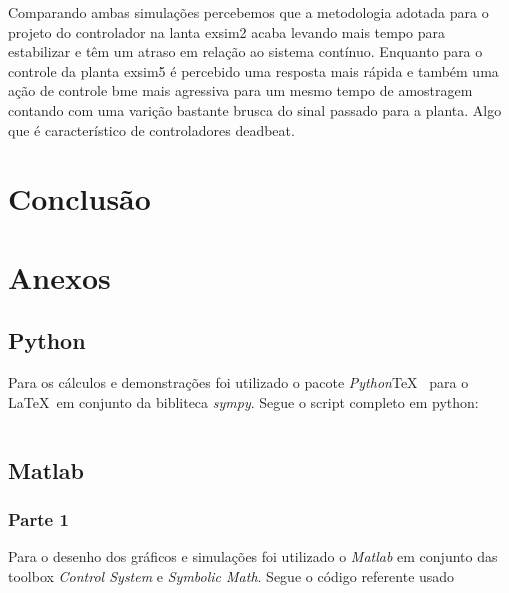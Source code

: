 \documentclass[a4paper,11pt]{article}
\begin{document}
Comparando ambas simulações percebemos que a metodologia adotada para o projeto do controlador na lanta exsim2 acaba levando mais tempo para estabilizar e têm um atraso em relação ao sistema contínuo. Enquanto para o controle da planta exsim5 é percebido uma resposta mais rápida e também uma ação de controle bme mais agressiva para um mesmo tempo de amostragem contando com uma varição bastante brusca do sinal passado para a planta. Algo que é característico de controladores deadbeat.

\section{Conclusão}


\newpage

\nocite{sympy}
\nocite{pythontex}
\nocite{matlabcontrol}
\nocite{matlabsymbolic}
\nocite{ogata2010modern}

\newpage
\section*{Anexos}
\subsection*{Python}

Para os cálculos e demonstrações foi utilizado o pacote \textit{Python}\TeX\ \cite{pythontex} para o \LaTeX\ em conjunto da bibliteca \textit{sympy}\cite{sympy}. Segue o script completo em python:

\inputminted[xleftmargin=15pt,linenos,frame=single,framesep=5pt,breaklines=true]{python}{../python/exsim5.py}

\newpage
\subsection*{Matlab}

\subsubsection*{Parte 1}
Para o desenho dos gráficos e simulações foi utilizado o \textit{Matlab} em conjunto das toolbox \textit{Control System}\cite{matlabcontrol} e \textit{Symbolic Math}\cite{matlabsymbolic}. Segue o código referente usado
\end{document}

